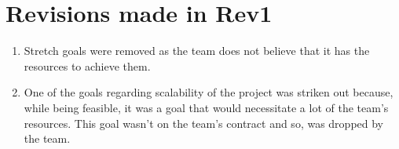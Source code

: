 \documentclass[fullpage]{article}
\newcommand{\be}{\begin{enumerate}}
\newcommand{\ee}{\end{enumerate}}
\begin{document}
\section{Revisions made in Rev1}
\be

	\item Stretch goals were removed as the team does not believe that it has the resources to achieve them.
	\item One of the goals regarding scalability of the project was striken out because, while being feasible, it was a goal that would necessitate a lot of the team's resources. This goal wasn't on the team's contract and so, was dropped by the team.
\ee
\end{document}

